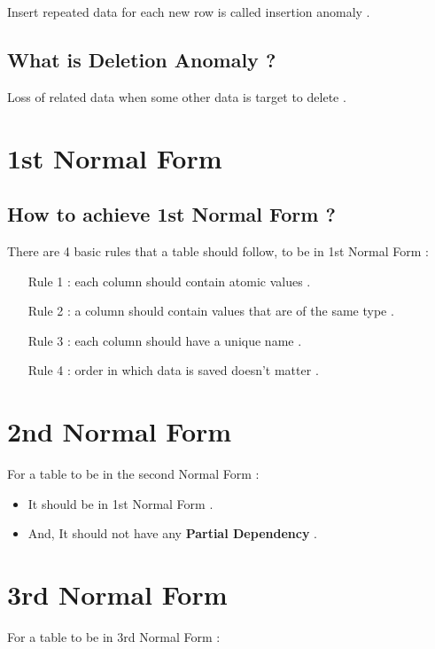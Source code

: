 \documentclass[10pt]{article}
\begin{document}
Insert repeated data for each new row is called insertion anomaly .

\subsection{What is Deletion Anomaly ?}

Loss of related data when some other data is target to delete .



\section{1st Normal Form}

\subsection{How to achieve 1st Normal Form ?}

There are 4 basic rules that a table should follow, to be in 1st Normal Form :

\begin{itemize}
	\item [Rule 1 : ] each column should contain atomic values .
	\item [Rule 2 : ] a column should contain values that are of the same type .
	\item [Rule 3 : ] each column should have a unique name .
	\item [Rule 4 : ] order in which data is saved doesn't matter . 
\end{itemize}



\section{2nd Normal Form}

For a table to be in the second Normal Form :

\begin{itemize}
	\item It should be in 1st Normal Form .
	\item And, It should not have any \textbf{Partial Dependency} .
\end{itemize}


\section{3rd Normal Form}

For a table to be in 3rd Normal Form :
\end{document}
